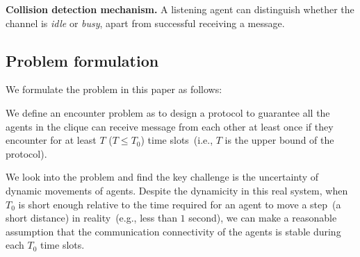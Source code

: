 



 


\textbf{Collision detection mechanism.}
A listening agent can distinguish whether the channel is \emph{idle} or \emph{busy}, 
apart from successful receiving a message. 

\subsection{Problem formulation}

We formulate the problem in this paper as follows:
\begin{problem}
    We define an encounter problem as to design a protocol to guarantee 
    all the agents in the clique can receive message from each other at least once 
    if they encounter for at least $T$ ($T \leq T_0$) time 
    slots~(i.e., $T$ is the upper bound of the protocol). 
\end{problem}


We look into the problem and find the key challenge is 
the uncertainty of dynamic movements
of agents. Despite the dynamicity in this real system, 
when $T_0$ is short enough relative to 
the time required for an agent to move a step~(a short distance)
in reality~(e.g., less than $1$ second),
we can make a reasonable assumption that the communication 
connectivity of the agents is stable during each $T_0$ time slots. 

